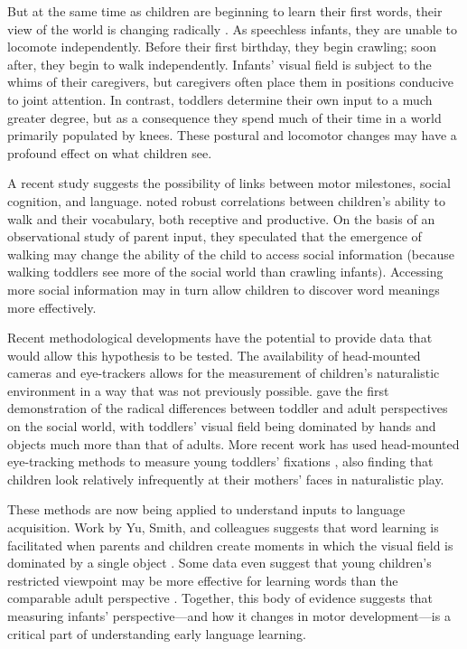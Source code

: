 \documentclass[10pt,letterpaper]{article}
\begin{document}
But at the same time as children are beginning to learn their first words, their view of the world is changing radically \cite{adolph2007}. As speechless infants, they are unable to locomote independently. Before their first birthday, they begin crawling; soon after, they begin to walk independently. Infants' visual field is subject to the whims of their caregivers, but caregivers often place them in positions conducive to joint attention. In contrast, toddlers determine their own input to a much greater degree, but as a consequence they spend much of their time in a world primarily populated by knees. These postural and locomotor changes may have a profound effect on what children see.

A recent study suggests the possibility of links between motor milestones, social cognition, and language.  noted robust correlations between children's ability to walk and their vocabulary, both receptive and productive. On the basis of an observational study of parent input, they speculated that the emergence of walking may change the ability of the child to access social information (because walking toddlers see more of the social world than crawling infants). Accessing more social information may in turn allow children to discover word meanings more effectively.

Recent methodological developments have the potential to provide data that would allow this hypothesis to be tested. The availability of head-mounted cameras and eye-trackers allows for the measurement of children's naturalistic environment in a way that was not previously possible.  gave the first demonstration of the radical differences between toddler and adult perspectives on the social world, with toddlers' visual field being dominated by hands and objects much more than that of adults. More recent work has used head-mounted eye-tracking methods to measure young toddlers' fixations \cite{franchak2011}, also finding that children look relatively infrequently at their mothers' faces in naturalistic play.

These methods are now being applied to understand inputs to language acquisition. Work by Yu, Smith, and colleagues suggests that word learning is facilitated when parents and children create moments in which the visual field is dominated by a single object \cite{smith2011,yuinpress}. Some data even suggest that young children's restricted viewpoint may be more effective for learning words than the comparable adult perspective \cite{yurovsky2012}. Together, this body of evidence suggests that measuring infants' perspective---and how it changes in motor development---is a critical part of understanding early language learning.
\end{document}
